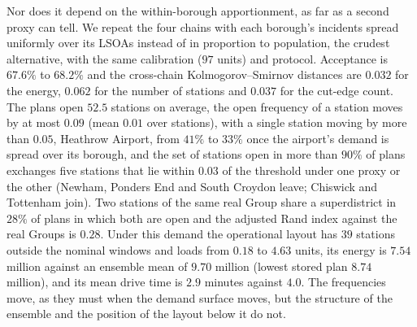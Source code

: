 \documentclass[preprint,12pt,authoryear]{elsarticle}
\theoremstyle{definition}
\begin{document}
Nor does it depend on the within-borough apportionment, as far as a second proxy can tell. We repeat the four chains with each borough's incidents spread uniformly over its LSOAs instead of in proportion to population, the crudest alternative, with the same calibration ($97$ units) and protocol. Acceptance is $67.6\%$ to $68.2\%$ and the cross-chain Kolmogorov--Smirnov distances are $0.032$ for the energy, $0.062$ for the number of stations and $0.037$ for the cut-edge count. The plans open $52.5$ stations on average, the open frequency of a station moves by at most $0.09$ (mean $0.01$ over stations), with a single station moving by more than $0.05$, Heathrow Airport, from $41\%$ to $33\%$ once the airport's demand is spread over its borough, and the set of stations open in more than $90\%$ of plans exchanges five stations that lie within $0.03$ of the threshold under one proxy or the other (Newham, Ponders End and South Croydon leave; Chiswick and Tottenham join). Two stations of the same real Group share a superdistrict in $28\%$ of plans in which both are open and the adjusted Rand index against the real Groups is $0.28$. Under this demand the operational layout has $39$ stations outside the nominal windows and loads from $0.18$ to $4.63$ units, its energy is $7.54$ million against an ensemble mean of $9.70$ million (lowest stored plan $8.74$ million), and its mean drive time is $2.9$ minutes against $4.0$. The frequencies move, as they must when the demand surface moves, but the structure of the ensemble and the position of the layout below it do not.
\end{document}
